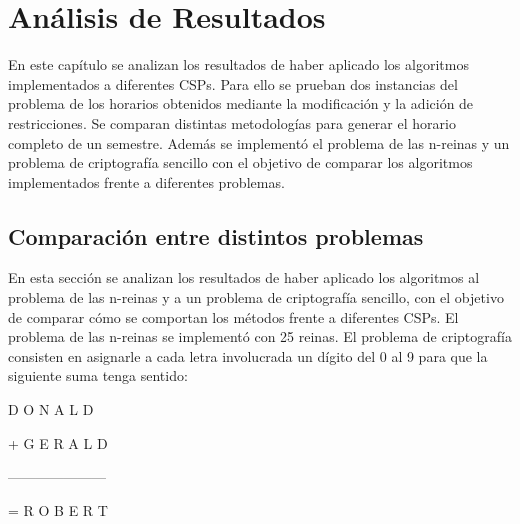 \chapter{An\'alisis de Resultados}

En este cap\'itulo se analizan los resultados de haber aplicado los algoritmos implementados a diferentes CSPs. Para ello se prueban dos instancias del problema de los horarios obtenidos mediante la modificaci\'on y la adici\'on de restricciones. Se comparan distintas metodolog\'ias para generar el horario completo de un semestre. Adem\'as se implement\'o el problema de las n-reinas y un problema de criptograf\'ia sencillo con el objetivo de comparar los algoritmos implementados frente a diferentes problemas.

\section{Comparaci\'on entre distintos problemas}

En esta secci\'on se analizan los resultados de haber aplicado los algoritmos al problema de las n-reinas y a un problema de criptograf\'ia sencillo, con el objetivo de comparar c\'omo se comportan los m\'etodos frente a diferentes CSPs. El problema de las n-reinas se implement\'o con 25 reinas. El problema de criptograf\'ia consisten en asignarle a cada letra involucrada un d\'igito del 0 al 9 para que la siguiente suma tenga sentido:

\begin{center}
\quad D O N A L D
	
+ G E R A L D

---------------------

= R O B E R T
\end{center}

